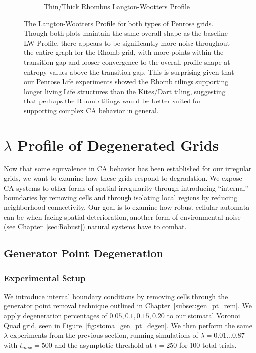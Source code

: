 \documentclass[a4paper,11pt,twoside]{report}
\begin{document}
\begin{figure}[htp]
\begin{subfigure}[t]{0.6\textwidth}
  \caption{Thin/Thick Rhombus Langton-Wootters Profile}
  \label{fig:crh_lw_profile}
  \end{subfigure}
\caption[Penrose Langton-Wootters Profile]{
  The Langton-Wootters Profile for both types of Penrose grids. Though both plots maintain the same overall shape as the baseline LW-Profile, there appears to be significantly more noise throughout the entire graph for the Rhomb grid, with more points within the transition gap and looser convergence to the overall profile shape at entropy values above the transition gap. This is surprising given that our Penrose Life experiments showed the Rhomb tilings supporting longer living Life structures than the Kites/Dart tiling, suggesting that perhaps the Rhomb tilings would be better suited for supporting complex CA behavior in general.
}
\label{fig:penrose_lw_profile}
\end{figure}

\section{$\lambda$ Profile of Degenerated Grids}

Now that some equivalence in CA behavior has been established for our irregular grids, we want to examine how these grids respond to degradation. We expose CA systems to other forms of spatial irregularity through introducing ``internal'' boundaries by removing cells and through isolating local regions by reducing neighborhood connectivity. Our goal is to examine how robust cellular automata can be when facing spatial deterioration, another form of environmental noise (see Chapter~\ref{sec:Robust}) natural systems have to combat.

\subsection{Generator Point Degeneration}
\label{subsec:ch6_gen_pt_degen}
\subsubsection*{Experimental Setup}
We introduce internal boundary conditions by removing cells through the generator point removal technique outlined in Chapter~\ref{subsec:gen_pt_rem}. We apply degeneration percentages of $0.05,0.1, 0.15, 0.20$ to our stomatal Voronoi Quad grid, seen in Figure~\ref{fig:stoma_gen_pt_degen}. We then perform the same $\lambda$ experiments from the previous section, running simulations of $\lambda=0.01...0.87$ with $t_{max} = 500$ and the asymptotic threshold at $t=250$ for 100 total trials. 
\end{document}
